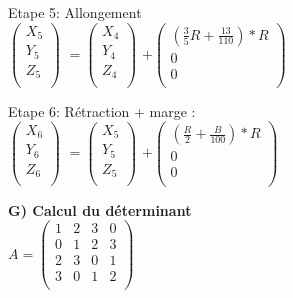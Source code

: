 Etape 5: Allongement \\

$
\begin{pmatrix}
  X_{5} \\
  Y_{5} \\
  Z_{5} \\
\end{pmatrix}
$
\vspace{3mm} %
$
=
\begin{pmatrix}
  X_{4} \\
  Y_{4} \\
  Z_{4} \\
\end{pmatrix}
$
\vspace{3mm} %
$
 +
\begin{pmatrix}
  (\frac{3}{5}R + \frac{13}{110})*R  \\
  0 \\
  0 \\
\end{pmatrix}
$

Etape 6: Rétraction + marge : \\

$
\begin{pmatrix}
  X_{6} \\
  Y_{6} \\
  Z_{6} \\
\end{pmatrix}
$
\vspace{3mm} %
$
=
\begin{pmatrix}
  X_{5} \\
  Y_{5} \\
  Z_{5} \\
\end{pmatrix}
$
\vspace{3mm} %
$
 +
\begin{pmatrix}
  (\frac{R}{2} + \frac{B}{100})*R  \\
  0 \\
  0 \\
\end{pmatrix}
$

\newpage

\textbf{G) Calcul du déterminant} \\

$
A =
\begin{pmatrix}
  1 & 2 & 3 & 0 \\
  0 & 1 & 2 & 3 \\
  2 & 3 & 0 & 1 \\
  3 & 0 & 1 & 2 \\
\end{pmatrix}
$

